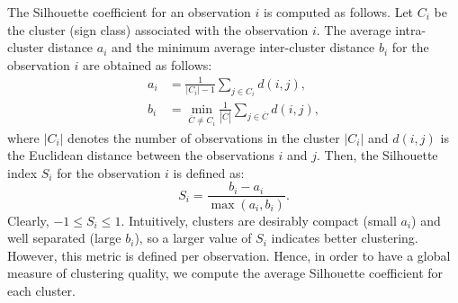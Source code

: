 The Silhouette coefficient for an observation $i$ is computed as follows. Let $C_i$ be the cluster (sign class) associated with the observation $i$. The average intra-cluster distance $a_i$ and the minimum average inter-cluster distance $b_i$ for the observation $i$ are obtained as follows:
\begin{align}
    a_i &= \frac{1}{|C_i|-1} \sum_{j \in C_i} d(i,j),\\
    b_i &= \min_{\overline{C} \neq C_i} \frac{1}{|\overline{C}|} \sum_{j \in \overline{C}} d(i,j),
\end{align}
where $|C_i|$ denotes the number of observations in the cluster $|C_i|$ and $d(i,j)$ is the Euclidean distance between the observations $i$ and $j$. Then, the Silhouette index $S_i$ for the observation $i$ is defined as:
\begin{equation}
    S_i = \frac{b_i - a_i}{\max(a_i, b_i)}.
\end{equation}
Clearly, $-1 \leq S_i \leq 1$. Intuitively, clusters are desirably compact (small $a_i$) and well separated (large $b_i$), so a larger value of $S_i$ indicates better clustering. However, this metric is defined per observation. Hence, in order to have a global measure of clustering quality, we compute the average Silhouette coefficient for each cluster.

